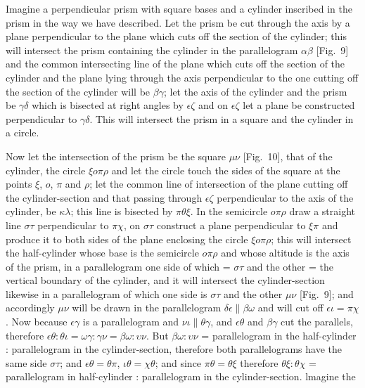\documentclass[12pt]{article}
\begin{document}
Imagine a perpendicular prism with square bases and a cylinder
inscribed in the prism in the way we have described. Let the prism be
cut through the axis by a plane perpendicular to the plane which cuts
off the section of the cylinder; this will intersect the prism
containing the cylinder in the parallelogram $\alpha\beta$ [Fig.~9]
and the common intersecting line of the plane which cuts off the
section of the cylinder and the plane lying through the axis
perpendicular to the one cutting off the section of the cylinder will
be $\beta\gamma$; let the axis of the cylinder and the prism be
$\gamma\delta$ which is bisected at right angles by $\epsilon\zeta$
and on $\epsilon\zeta$ let a plane be constructed perpendicular to
$\gamma\delta$. This will intersect the prism in a square and the
cylinder in a circle.

Now let the intersection of the prism be the square $\mu\nu$
[Fig.~10], that of the cylinder, the circle $\xi o\pi\rho$ and let the
circle touch the sides of the square at the points $\xi$, $o$, $\pi$
and $\rho$; let the common line of intersection of the plane cutting
off the cylinder-section and that passing through $\epsilon\zeta$
perpendicular to the axis of the cylinder, be $\kappa\lambda$; this
line is bisected by $\pi\theta\xi$.  In the semicircle $o\pi\rho$ draw
a straight line $\sigma\tau$ perpendicular to $\pi\chi$, on
$\sigma\tau$ construct a plane perpendicular to $\xi\pi$ and produce
it to both sides of the plane enclosing the circle $\xi o\pi\rho$;
this will intersect the half-cylinder whose base is the semicircle
$o\pi\rho$ and whose altitude is the axis of the prism, in a
parallelogram one side of which = $\sigma\tau$ and the other = the
vertical boundary of the cylinder, and it will intersect the
cylinder-section likewise in a parallelogram of which one side is
$\sigma\tau$ and the other $\mu\nu$ [Fig.~9]; and accordingly $\mu\nu$
will be drawn in the parallelogram $\delta\epsilon \| \beta\omega$ and
will cut off $\epsilon\iota = \pi\chi$.  Now because $\epsilon\gamma$
is a parallelogram and $\nu\iota \| \theta\gamma$, and
$\epsilon\theta$ and $\beta\gamma$ cut the parallels, therefore
$\epsilon\theta : \theta\iota = \omega\gamma : \gamma\nu = \beta\omega
: \upsilon\nu$. But $\beta\omega : \upsilon\nu$ = parallelogram in the
half-cylinder : parallelogram in the cylinder-section, therefore both
parallelograms have the same side $\sigma\tau$; and $\epsilon\theta =
\theta\pi$, $\iota\theta = \chi\theta$; and since $\pi\theta =
\theta\xi$ therefore $\theta\xi : \theta\chi$ = parallelogram in
half-cylinder : parallelogram in the cylinder-section. lmagine the
\end{document}
